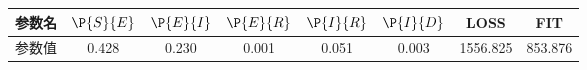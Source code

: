 \begin{tabular}{cccccccc}
\hline
参数名&$\P{S}{E}$&$\P{E}{I}$&$\P{E}{R}$&$\P{I}{R}$&$\P{I}{D}$&LOSS&FIT\\
\hline
参数值&0.428&0.230&0.001&0.051&0.003&1556.825&853.876\\
\hline
\end{tabular}
